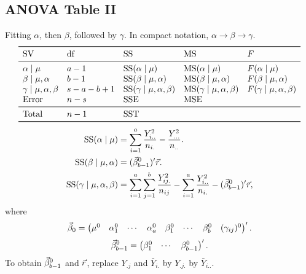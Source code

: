 \subsection*{ANOVA Table II}
Fitting $ \alpha $, then $ \beta $, followed by $ \gamma $. In compact notation,
$ \alpha\to\beta\to \gamma $.
\[ \begin{array}{lllll}
        \toprule
        \text{SV}                   & \text{df} & \text{SS}                              & \text{MS}                              & F                              \\
        \midrule
        \alpha\mid \mu              & a-1       & \text{SS}(\alpha\mid \mu)              & \text{MS}(\alpha\mid \mu)              & F(\alpha\mid \mu)              \\
        \beta\mid \mu,\alpha        & b-1       & \text{SS}(\beta\mid \mu,\alpha)        & \text{MS}(\beta\mid \mu,\alpha)        & F(\beta\mid \mu,\alpha)        \\

        \gamma\mid \mu,\alpha,\beta & s-a-b+1   & \text{SS}(\gamma\mid \mu,\alpha,\beta) & \text{MS}(\gamma\mid \mu,\alpha,\beta) & F(\gamma\mid \mu,\alpha,\beta) \\
        \text{Error}                & n-s       & \SSE                                   & \MSE                                                                    \\
        \midrule
        \text{Total}                & n-1       & \SST                                                                                                             \\
        \bottomrule
    \end{array} \]
\begin{align*}
    \text{SS}(\alpha\mid \mu)              & =\sum_{i=1}^{a}\frac{Y_{i..}^2}{n_{i.}}-\frac{Y_{...}^2}{n_{..}}.                                                                  \\
    \text{SS}(\beta\mid \mu,\alpha)        & =(\vec{\beta}_{b-1}^0)' \vec{r}.                                                                                             \\
    \text{SS}(\gamma\mid \mu,\alpha,\beta) & =\sum_{i=1}^{a}\sum_{j=1}^{b}\frac{Y_{ij.}^2}{n_{ij}}-\sum_{i=1}^{a}\frac{Y_{i..}^2}{n_{i.}}-(\vec{\beta}_{b-1}^0)' \vec{r},
\end{align*}
where
\[ \vec{\beta}_0=\begin{pmatrix}
        \mu^0 & \alpha_1^0 & \cdots & \alpha_a^0 & \beta_1^0 & \cdots & \beta_b^0 & (\gamma_{ij})^0
    \end{pmatrix}'. \]
\[ \vec{\beta}_{b-1}^0=\begin{pmatrix}
        \beta_1^0 & \cdots & \beta_{b-1}^0
    \end{pmatrix}'. \]
To obtain $ \vec{\beta}_{b-1}^0 $ and $ \vec{r} $,
replace $ Y_{.j} $ and $ \bar{Y}_{i.} $ by
$ Y_{.j.} $ by $ \bar{Y}_{i..} $.
